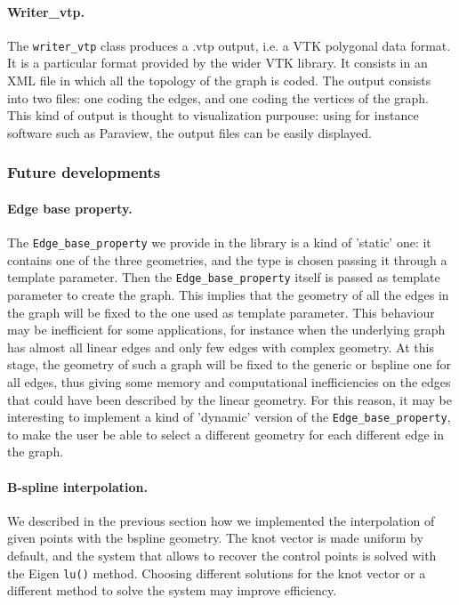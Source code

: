 \documentclass[10pt]{article} %
\newcommand{\classname}[1]{\texttt{#1}}
\begin{document}
	\paragraph{Writer\_vtp.} The \texttt{writer\_vtp} class produces a .vtp output, i.e. a VTK polygonal data format. It is a particular format provided by the wider VTK library. It consists in an XML file in which all the topology of the graph is coded. The output consists into two files: one coding the edges, and one coding the vertices of the graph. This kind of output is thought to visualization purpouse: using for instance software such as Paraview, the output files can be easily displayed.
	
	\subsubsection{Future developments}
	\paragraph{Edge base property.} The \classname{Edge\_base\_property} we provide in the library is a kind of 'static' one: it contains one of the three geometries, and the type is chosen passing it through a template parameter. Then the \classname{Edge\_base\_property} itself is passed as template parameter to create the graph. This implies that the geometry of all the edges in the graph will be fixed to the one used as template parameter. This behaviour may be inefficient for some applications, for instance when the underlying graph has almost all linear edges and only few edges with complex geometry. At this stage, the geometry of such a graph will be fixed to the generic or bspline one for all edges, thus giving some memory and computational inefficiencies on the edges that could have been described by the linear geometry. For this reason, it may be interesting to implement a kind of 'dynamic' version of the \classname{Edge\_base\_property}, to make the user be able to select a different geometry for each different edge in the graph.
	\paragraph{B-spline interpolation.} We described in the previous section how we implemented the interpolation of given points with the bspline geometry. The knot vector is made uniform by default, and the system that allows to recover the control points is solved with the Eigen \texttt{lu()} method. Choosing different solutions for the knot vector or a different method to solve the system may improve efficiency.
	
\end{document}
